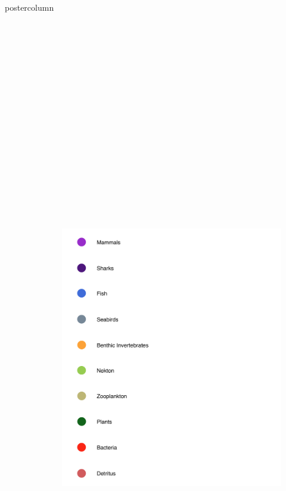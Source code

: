 \documentclass[final,hyperref={pdfpagelabels=false}]{beamer}
\begin{document}
\begin{frame}
\begin{columns}
\begin{column}{1\textwidth}
\begin{beamercolorbox}[center,wd=\textwidth]{postercolumn}
\begin{minipage}[T]{.98\textwidth}
{\begin{block}{}
\begin{columns}
\begin{column}{.85\textwidth}
\begin{figure}
                \footnotesize
                   \end{figure}
              \end{column}
              \begin{column}{.15\textwidth}
              \begin{figure}
              \centering
              \includegraphics[height = 30cm]{images/food_web_legend.pdf}

\end{figure}
\end{column}
\end{columns}
\end{block}}
\end{minipage}
\end{beamercolorbox}
\end{column}
\end{columns}
\end{frame}
\end{document}
